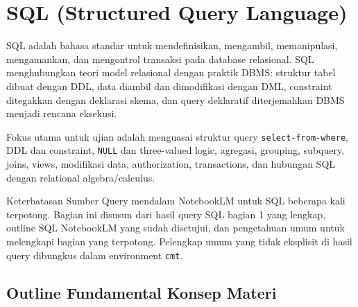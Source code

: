 \section{SQL (Structured Query Language)}

SQL adalah bahasa standar untuk mendefinisikan, mengambil, memanipulasi, mengamankan, dan mengontrol transaksi pada database relasional. SQL menghubungkan teori model relasional dengan praktik DBMS: struktur tabel dibuat dengan DDL, data diambil dan dimodifikasi dengan DML, constraint ditegakkan dengan deklarasi skema, dan query deklaratif diterjemahkan DBMS menjadi rencana eksekusi.

Fokus utama untuk ujian adalah menguasai struktur query \texttt{select-from-where}, DDL dan constraint, \texttt{NULL} dan three-valued logic, agregasi, grouping, subquery, joins, views, modifikasi data, authorization, transactions, dan hubungan SQL dengan relational algebra/calculus.

\begin{cmt}{Keterbatasan Sumber}{}
Query mendalam NotebookLM untuk SQL beberapa kali terpotong. Bagian ini disusun dari hasil query SQL bagian 1 yang lengkap, outline SQL NotebookLM yang sudah disetujui, dan pengetahuan umum untuk melengkapi bagian yang terpotong. Pelengkap umum yang tidak eksplisit di hasil query dibungkus dalam environment \texttt{cmt}.
\end{cmt}

\subsection{Outline Fundamental Konsep Materi}

